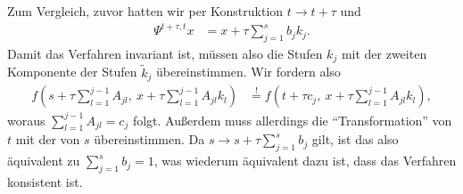 \documentclass[english, parskip=full]{scrartcl}
\newcommand{\kla}{}
\begin{document}
Zum Vergleich, zuvor hatten wir per Konstruktion $t \rightarrow t+\tau$ und
\begin{align}
\Psi^{t+\tau,t} x &= x + \tau \sum_{j=1}^s b_j k_j.
\end{align}
Damit das Verfahren invariant ist, müssen also die Stufen $k_j$ mit der zweiten Komponente der Stufen $\tilde{k}_j$ übereinstimmen.
Wir fordern also
\begin{align}
f\kla\left( s + \tau\sum_{l=1}^{j-1} A_{jl},\ x + \tau \sum_{l=1}^{j-1} A_{jl} k_l \right) &\overset{!}{=} f \kla\left( t + \tau c_j,\ x + \tau\sum_{l=1}^{j-1}A_{jl} k_l \right),
\end{align}
woraus $\sum_{l=1}^{j-1} A_{jl} = c_j$ folgt.
Außerdem muss allerdings die ``Transformation'' von $t$ mit der von $s$ übereinstimmen.
Da $s \rightarrow s + \tau \sum_{j=1}^s b_j$ gilt, ist das also äquivalent zu $\sum_{j=1}^s b_j = 1$, was wiederum äquivalent dazu ist, dass das Verfahren konsistent ist.
\end{document}
